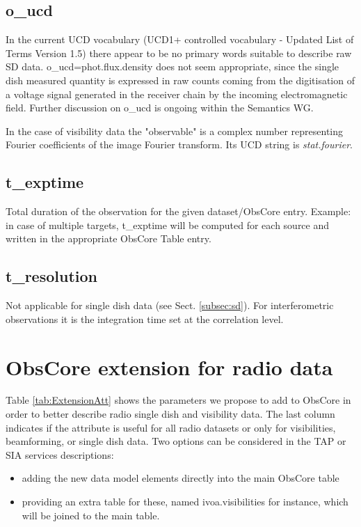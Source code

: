 \documentclass[11pt,a4paper]{ivoa}
\begin{document}
\subsection{o\_ucd}

In the current UCD vocabulary (UCD1+ controlled vocabulary - Updated List of Terms Version 1.5) there appear to be no primary words suitable to describe raw SD data. o\_ucd=phot.flux.density does not seem appropriate, since the single dish measured quantity is expressed in raw counts coming from the digitisation of a voltage signal generated in the receiver chain by the incoming electromagnetic field. Further discussion on o\_ucd is ongoing within the Semantics WG.

In the case of visibility data the "observable" is a complex number representing Fourier 
coefficients of the image Fourier transform. Its UCD string is \emph{stat.fourier}. 

\subsection{t\_exptime}
Total duration of the observation for the given dataset/ObsCore entry. Example: in case of multiple targets, t\_exptime will be computed for each source and written in the appropriate ObsCore Table entry. 


\subsection{t\_resolution}
Not applicable for single dish data (see Sect. \ref{subsec:sd}). For interferometric observations it is the integration time set at the correlation level.


\section{ObsCore extension for radio data}

Table \ref{tab:ExtensionAtt} shows the %
parameters we propose to add to ObsCore in order to better describe radio single dish and visibility data.
The last column indicates if the attribute is useful for all radio datasets or only for visibilities, beamforming, or single dish data.
Two options can be considered in the TAP or SIA services descriptions: 
\begin{itemize}
\item adding the new data model elements directly into the main ObsCore table
\item providing an extra table for these, named ivoa.visibilities for instance,  which will 
be joined to the main table. 
\end{itemize}
\end{document}
